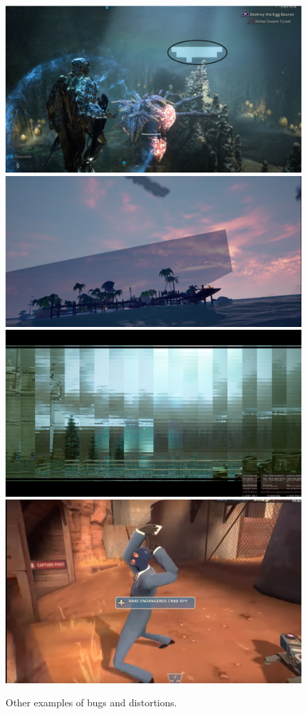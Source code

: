 \documentclass[12pt]{article}
\begin{document}
\begin{figure}[!ht]
\centering
\includegraphics[scale=0.19]{bug1.png}
\includegraphics[scale=0.23]{bug2.png}
\includegraphics[scale=0.19]{bug3.png}
\includegraphics[scale=0.15]{distortion.png}
\caption{Other examples of bugs and distortions.}
\label{fig:2}
\end{figure}
\end{document}

